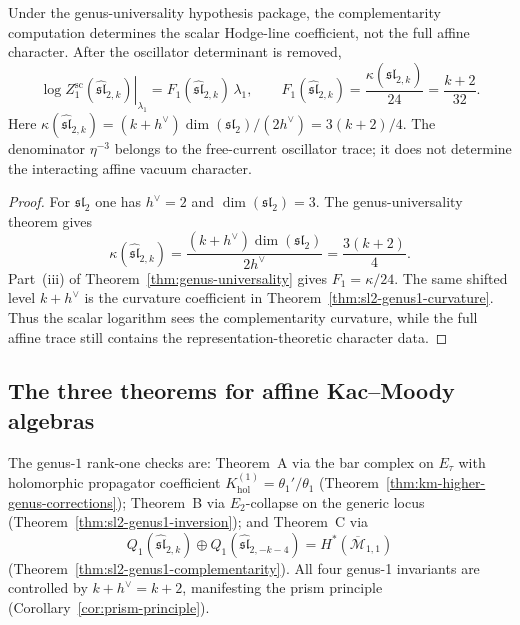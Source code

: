 \begin{proposition}
\label{prop:sl2-genus1-partition}
Under the genus-universality hypothesis package, the complementarity
computation determines the scalar Hodge-line coefficient, not the full
affine character. After the oscillator determinant is removed,
\begin{equation}\label{eq:sl2-genus1-partition}
\left.\log Z_1^{\mathrm{sc}}(\widehat{\mathfrak{sl}}_{2,k})\right|_{\lambda_1}
= F_1(\widehat{\mathfrak{sl}}_{2,k})\,\lambda_1,
\qquad
F_1(\widehat{\mathfrak{sl}}_{2,k})
= \frac{\kappa(\widehat{\mathfrak{sl}}_{2,k})}{24}
= \frac{k+2}{32}.
\end{equation}
Here
\(\kappa(\widehat{\mathfrak{sl}}_{2,k})
= (k+h^\vee)\dim(\mathfrak{sl}_2)/(2h^\vee)
=3(k+2)/4\). The denominator $\eta^{-3}$ belongs to the free-current
oscillator trace; it does not determine the interacting affine
vacuum character.
\end{proposition}

\begin{proof}
For $\mathfrak{sl}_2$ one has $h^\vee=2$ and
$\dim(\mathfrak{sl}_2)=3$. The genus-universality theorem gives
\[
\kappa(\widehat{\mathfrak{sl}}_{2,k})
=\frac{(k+h^\vee)\dim(\mathfrak{sl}_2)}{2h^\vee}
=\frac{3(k+2)}4 .
\]
Part~\textup{(iii)} of Theorem~\ref{thm:genus-universality} gives
$F_1=\kappa/24$. The same shifted level $k+h^\vee$ is the curvature
coefficient in Theorem~\ref{thm:sl2-genus1-curvature}. Thus the
scalar logarithm sees the complementarity curvature, while the full
affine trace still contains the representation-theoretic character
data.
\end{proof}

\subsection{The three theorems for affine Kac--Moody algebras}

\begin{remark}
\label{rem:sl2-three-theorems}
The genus-$1$ rank-one checks are: Theorem~A via the bar complex on
$E_\tau$ with holomorphic propagator coefficient
$K^{(1)}_{\mathrm{hol}} = \theta_1'/\theta_1$
(Theorem~\ref{thm:km-higher-genus-corrections}); Theorem~B via
$E_2$-collapse on the generic locus
(Theorem~\ref{thm:sl2-genus1-inversion}); and Theorem~C via
\[
Q_1(\widehat{\mathfrak{sl}}_{2,k}) \oplus Q_1(\widehat{\mathfrak{sl}}_{2,-k-4}) = H^*(\overline{\mathcal{M}}_{1,1})
\]
(Theorem~\ref{thm:sl2-genus1-complementarity}). All four genus-1 invariants are controlled by $k + h^\vee = k + 2$, manifesting the prism principle (Corollary~\ref{cor:prism-principle}).
\end{remark}

